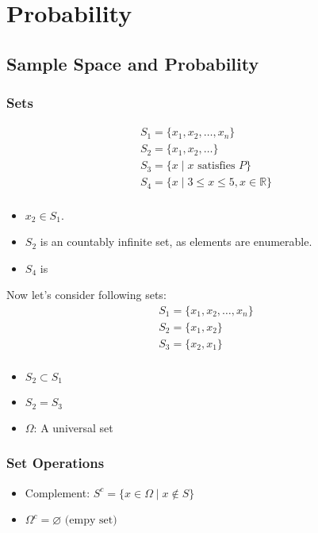 \chapter{Probability}

\section{Sample Space and Probability}

\subsection{Sets}

\begin{gather*}
    S_1 = \{x_1, x_2, \dots, x_n\}\\
    S_2 = \{x_1, x_2, \dots\}\\
    S_3 = \{x \mid x \text{ satisfies } P\}\\
    S_4 = \{x \mid 3 \leq x \leq 5, x \in \mathbb{R} \}\\
\end{gather*}

\begin{itemize}
    \item $x_2 \in S_1$.
    \item $S_2$ is an countably infinite set, as elements are enumerable.
    \item $S_4$ is
\end{itemize}

Now let's consider following sets:
\begin{gather*}
    S_1 = \{x_1, x_2, \dots, x_n\}\\
    S_2 = \{x_1, x_2\}\\
    S_3 = \{x_2, x_1\}\\
\end{gather*}

\begin{itemize}
    \item $S_2 \subset S_1$
    \item $S_2 = S_3$
    \item $\Omega$: A universal set
\end{itemize}

\subsection{Set Operations}

\begin{itemize}
    \item Complement: $S^c = \{x \in \Omega \mid x \notin S\}$
    \item $\Omega^c = \varnothing \text{ (empy set)}$
\end{itemize}